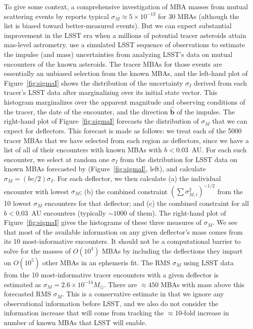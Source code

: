 \documentclass[linenumbers, onecolumn]{aastex631}
\newcommand{\bhat}{\mathbf{\hat b}}
\begin{document}
To give some context, a
comprehensive investigation of MBA masses from mutual scattering
events by \citet{goffin} reports typical $\sigma_M\approx
5\times10^{-13}$ for 30 MBAs (although the list is biased toward
better-measured events). But we can expect substantial improvement
in the LSST era when a millions of potential tracer asteroids attain
mas-level astrometry. \citet{negin} use a simulated LSST sequence of
observations to estimate the impulse (and mass) uncertainties from
analyzing LSST's data on mutual encounters of the known asteroids. The
tracer MBAs for those events are essentially an unbiased selection
from the known MBAs, and the left-hand plot of Figure~\ref{fig:sigmaI}
shows the distribution of the uncertainty $\sigma_I$ derived from each
tracer's LSST data after marginalizing over its initial state vector.
This histogram marginalizes over the apparent magnitude and observing
conditions of the tracer, the date of the encounter, and the direction
$\bhat$ of the impulse.  The right-hand plot of
Figure~\ref{fig:sigmaI} forecasts the distribution of $\sigma_M$ that
we can expect for deflectors.  This forecast is made as follows: we
treat each of the 5000 tracer MBAs that we have selected from each
region as deflectors, since we have a list of all of their encounters
with known MBAs with $b<0.03$~AU.  For each such encounter, we select
at random one $\sigma_I$ from the distribution for LSST data on known
MBAs forecasted by \citet{negin} (Figure~\ref{fig:sigmaI}, left), and
calculate $\sigma_M=(bv/2)\sigma_I.$  For each deflector, we then
calculate (a) the individual encounter with lowest $\sigma_M$; (b) the
combined constraint $\left(\sum \sigma_{M,i}^2\right)^{-1/2}$ from the
10 lowest $\sigma_M$ encounters for that deflector; and (c) the
combined constraint for all $b<0.03$~AU encounters (typically
$\sim1000$ of them).  The right-hand plot of Figure~\ref{fig:sigmaI}
gives the histograms of these three measures of $\sigma_M.$  We see
that most of the available information on any given deflector's mass
comes from its 10 most-informative encounters.  It should not be a
computational barrier to solve for the masses of $O(10^4)$ MBAs by including the deflections they impart on $O(10^5)$ other MBAs in an ephemeris fit.
The RMS $\sigma_M$ using LSST data from the 10 most-informative tracer encounters with a given deflector is estimated as $\sigma_M=2.6\times10^{-14}M_\odot.$ There are $\approx450$ MBAs with mass above this forecasted RMS $\sigma_M.$  This is a conservative estimate in that we ignore any observational information before LSST, and we also do not consider the information increase that will come from tracking the $\approx10$-fold increase in number of known MBAs that LSST will enable.  
\end{document}
